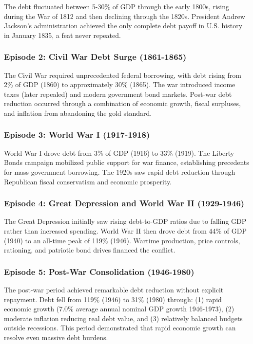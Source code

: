 \documentclass[12pt,letterpaper]{article}
\begin{document}
The debt fluctuated between 5-30\% of GDP through the early 1800s, rising during the War of 1812 and then declining through the 1820s. President Andrew Jackson's administration achieved the only complete debt payoff in U.S. history in January 1835, a feat never repeated.

\subsubsection{Episode 2: Civil War Debt Surge (1861-1865)}

The Civil War required unprecedented federal borrowing, with debt rising from 2\% of GDP (1860) to approximately 30\% (1865). The war introduced income taxes (later repealed) and modern government bond markets. Post-war debt reduction occurred through a combination of economic growth, fiscal surpluses, and inflation from abandoning the gold standard.

\subsubsection{Episode 3: World War I (1917-1918)}

World War I drove debt from 3\% of GDP (1916) to 33\% (1919). The Liberty Bonds campaign mobilized public support for war finance, establishing precedents for mass government borrowing. The 1920s saw rapid debt reduction through Republican fiscal conservatism and economic prosperity.

\subsubsection{Episode 4: Great Depression and World War II (1929-1946)}

The Great Depression initially saw rising debt-to-GDP ratios due to falling GDP rather than increased spending. World War II then drove debt from 44\% of GDP (1940) to an all-time peak of 119\% (1946). Wartime production, price controls, rationing, and patriotic bond drives financed the conflict.

\subsubsection{Episode 5: Post-War Consolidation (1946-1980)}

The post-war period achieved remarkable debt reduction without explicit repayment. Debt fell from 119\% (1946) to 31\% (1980) through: (1) rapid economic growth (7.0\% average annual nominal GDP growth 1946-1973), (2) moderate inflation reducing real debt value, and (3) relatively balanced budgets outside recessions. This period demonstrated that rapid economic growth can resolve even massive debt burdens.
\end{document}
